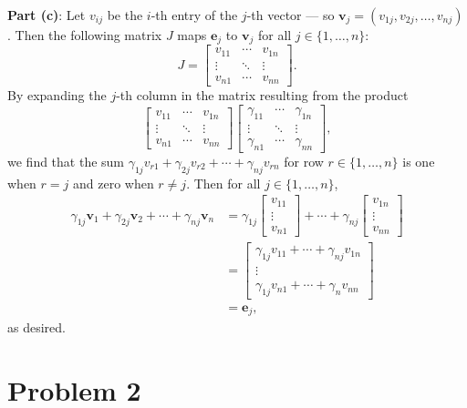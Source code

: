 \documentclass[11pt]{article}
\renewcommand{\vec}[1]{\mathbf{#1}}
\begin{document}
\textbf{Part (c)}: Let $v_{ij}$ be the $i$-th entry of the $j$-th vector --- so $\vec{v}_{j} = (v_{1j}, v_{2j}, \ldots, v_{nj})$. Then the following matrix $J$ maps $\vec{e}_{j}$ to $\vec{v}_{j}$ for all $j \in \{ 1, \ldots, n \}$:
\[
	J = \begin{bmatrix} v_{11} & \cdots & v_{1n} \\ \vdots & \ddots & \vdots \\ v_{n1} & \cdots & v_{nn} \end{bmatrix}.
\]
By expanding the $j$-th column in the matrix resulting from the product
\[
	\begin{bmatrix} v_{11} & \cdots & v_{1n} \\ \vdots & \ddots & \vdots \\ v_{n1} & \cdots & v_{nn} \end{bmatrix} \begin{bmatrix} \gamma_{11} & \cdots & \gamma_{1n} \\ \vdots & \ddots & \vdots \\ \gamma_{n1} & \cdots & \gamma_{nn} \end{bmatrix},
\]
we find that the sum $\gamma_{1j} v_{r1} + \gamma_{2j} v_{r2} + \cdots + \gamma_{nj} v_{rn}$ for row $r \in \{ 1, \ldots, n \}$ is one when $r = j$ and zero when $r \ne j$. Then for all $j \in \{ 1, \ldots, n \}$,
\begin{align*}
	\gamma_{1j} \vec{v}_{1} + \gamma_{2j} \vec{v}_{2} + \cdots + \gamma_{nj} \vec{v}_{n} &= \gamma_{1j} \begin{bmatrix} v_{11} \\ \vdots \\ v_{n1} \end{bmatrix} + \cdots + \gamma_{nj} \begin{bmatrix} v_{1n} \\ \vdots \\ v_{nn} \end{bmatrix}\\
	&= \begin{bmatrix} \gamma_{1j} v_{11} + \cdots + \gamma_{nj} v_{1n} \\ \vdots \\ \gamma_{1j} v_{n1} + \cdots + \gamma_{n} v_{nn} \end{bmatrix} \\
	&= \vec{e}_{j}, 
\end{align*}
as desired.


\section{Problem 2}
\end{document}
